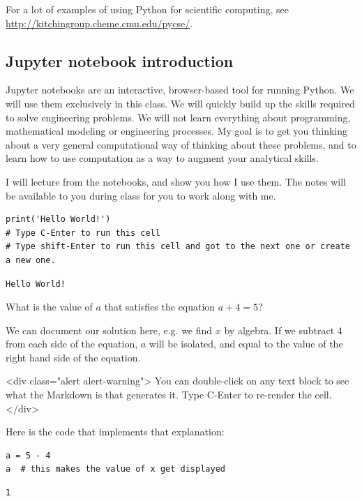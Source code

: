 \documentclass[11pt]{article}
\begin{document}
For a lot of examples of using Python for scientific computing, see \url{http://kitchingroup.cheme.cmu.edu/pycse/}.

\subsection{Jupyter notebook introduction}
\label{sec:orgf4a6507}

Jupyter notebooks are an interactive, browser-based tool for running Python. We will use them exclusively in this class. We will quickly build up the skills required to solve engineering problems. We will not learn everything about programming, mathematical modeling or engineering processes. My goal is to get you thinking about a very general computational way of thinking about these problems, and to learn how to use computation as a way to augment your analytical skills.

I will lecture from the notebooks, and show you how I use them. The notes will be available to you during class for you to work along with me.

\begin{verbatim}
print('Hello World!')
# Type C-Enter to run this cell
# Type shift-Enter to run this cell and got to the next one or create a new one.
\end{verbatim}

\begin{verbatim}
Hello World!

\end{verbatim}

What is the value of \(a\) that satisfies the equation \(a + 4 = 5\)?

We can document our solution here, e.g. we find \(x\) by algebra. If we subtract 4 from each side of the equation, \(a\) will be isolated, and equal to the value of the right hand side of the equation.

<div class="alert alert-warning">
You can double-click on any text block to see what the Markdown is that generates it. Type C-Enter to re-render the cell.
</div>

Here is the code that implements that explanation:

\begin{verbatim}
a = 5 - 4
a  # this makes the value of x get displayed
\end{verbatim}

\begin{verbatim}
1
\end{verbatim}
\end{document}

